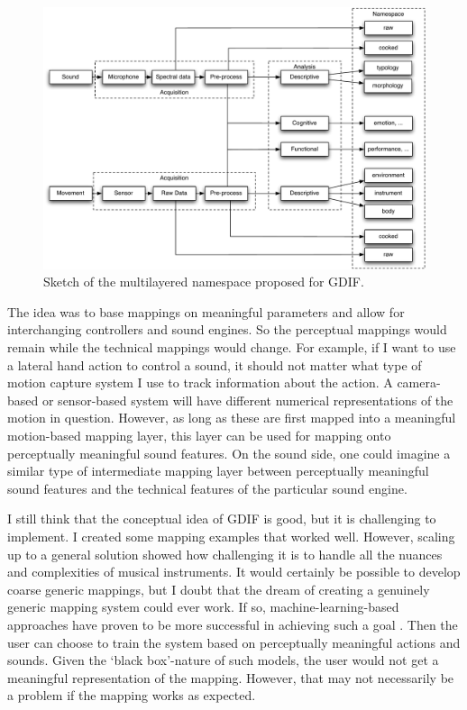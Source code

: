 \begin{figure}[tbp]
 			\includegraphics[width=1\columnwidth]{figures/35-gdif-namespace.pdf}
 			\caption{Sketch of the multilayered namespace proposed for GDIF.}
            \label{fig:gdif-namespace}
\end{figure}

The idea was to base mappings on meaningful parameters and allow for interchanging controllers and sound engines. So the perceptual mappings would remain while the technical mappings would change. For example, if I want to use a lateral hand action to control a sound, it should not matter what type of motion capture system I use to track information about the action. A camera-based or sensor-based system will have different numerical representations of the motion in question. However, as long as these are first mapped into a meaningful motion-based mapping layer, this layer can be used for mapping onto perceptually meaningful sound features. On the sound side, one could imagine a similar type of intermediate mapping layer between perceptually meaningful sound features and the technical features of the particular sound engine.

I still think that the conceptual idea of GDIF is good, but it is challenging to implement. I created some mapping examples that worked well. However, scaling up to a general solution showed how challenging it is to handle all the nuances and complexities of musical instruments. It would certainly be possible to develop coarse generic mappings, but I doubt that the dream of creating a genuinely generic mapping system could ever work. If so, machine-learning-based approaches have proven to be more successful in achieving such a goal \citep{fiebrink_wekinator_2011}. Then the user can choose to train the system based on perceptually meaningful actions and sounds. Given the `black box'-nature of such models, the user would not get a meaningful representation of the mapping. However, that may not necessarily be a problem if the mapping works as expected.

